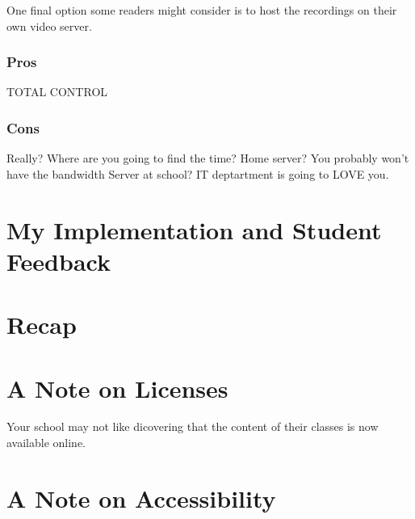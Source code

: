 \documentclass[sigconf]{acmart}
\begin{document}
One final option some readers might consider is to host the recordings on their own video server.
\subsubsection{Pros}
TOTAL CONTROL
\subsubsection{Cons}

Really?  Where are you going to find the time?
Home server? You probably won't have the bandwidth
Server at school?  IT deptartment is going to LOVE you.


\section{My Implementation and Student Feedback}

\section{Recap}



\section{A Note on Licenses}



Your school may not like dicovering that the content of their classes is now available online.

\section{A Note on Accessibility}


\end{document}
